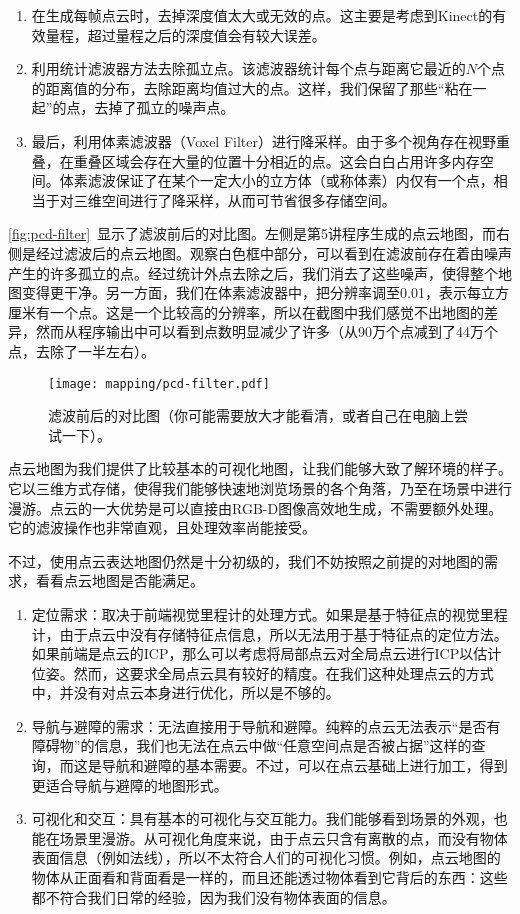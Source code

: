 \begin{enumerate}
	\item 在生成每帧点云时，去掉深度值太大或无效的点。这主要是考虑到Kinect的有效量程，超过量程之后的深度值会有较大误差。
	\item 利用统计滤波器方法去除孤立点。该滤波器统计每个点与距离它最近的$N$个点的距离值的分布，去除距离均值过大的点。这样，我们保留了那些“粘在一起”的点，去掉了孤立的噪声点。
	\item 最后，利用体素滤波器（Voxel Filter）进行降采样。由于多个视角存在视野重叠，在重叠区域会存在大量的位置十分相近的点。这会白白占用许多内存空间。体素滤波保证了在某个一定大小的立方体（或称体素）内仅有一个点，相当于对三维空间进行了降采样，从而可节省很多存储空间。
\end{enumerate}

\autoref{fig:pcd-filter}~显示了滤波前后的对比图。左侧是第5讲程序生成的点云地图，而右侧是经过滤波后的点云地图。观察白色框中部分，可以看到在滤波前存在着由噪声产生的许多孤立的点。经过统计外点去除之后，我们消去了这些噪声，使得整个地图变得更干净。另一方面，我们在体素滤波器中，把分辨率调至0.01，表示每立方厘米有一个点。这是一个比较高的分辨率，所以在截图中我们感觉不出地图的差异，然而从程序输出中可以看到点数明显减少了许多（从90万个点减到了44万个点，去除了一半左右）。

\begin{figure}[!ht]
	\centering
	\texttt{[image: mapping/pcd-filter.pdf]}
	\caption{滤波前后的对比图（你可能需要放大才能看清，或者自己在电脑上尝试一下）。}
	\label{fig:pcd-filter}
\end{figure}

点云地图为我们提供了比较基本的可视化地图，让我们能够大致了解环境的样子。它以三维方式存储，使得我们能够快速地浏览场景的各个角落，乃至在场景中进行漫游。点云的一大优势是可以直接由RGB-D图像高效地生成，不需要额外处理。它的滤波操作也非常直观，且处理效率尚能接受。

不过，使用点云表达地图仍然是十分初级的，我们不妨按照之前提的对地图的需求，看看点云地图是否能满足。
\enlargethispage{-3pt}
\begin{enumerate}
	\item 定位需求：取决于前端视觉里程计的处理方式。如果是基于特征点的视觉里程计，由于点云中没有存储特征点信息，所以无法用于基于特征点的定位方法。如果前端是点云的ICP，那么可以考虑将局部点云对全局点云进行ICP以估计位姿。然而，这要求全局点云具有较好的精度。在我们这种处理点云的方式中，并没有对点云本身进行优化，所以是不够的。
	\item 导航与避障的需求：无法直接用于导航和避障。纯粹的点云无法表示“是否有障碍物”的信息，我们也无法在点云中做“任意空间点是否被占据”这样的查询，而这是导航和避障的基本需要。不过，可以在点云基础上进行加工，得到更适合导航与避障的地图形式。
	\item 可视化和交互：具有基本的可视化与交互能力。我们能够看到场景的外观，也能在场景里漫游。从可视化角度来说，由于点云只含有离散的点，而没有物体表面信息（例如法线），所以不太符合人们的可视化习惯。例如，点云地图的物体从正面看和背面看是一样的，而且还能透过物体看到它背后的东西：这些都不符合我们日常的经验，因为我们没有物体表面的信息。
\end{enumerate}

